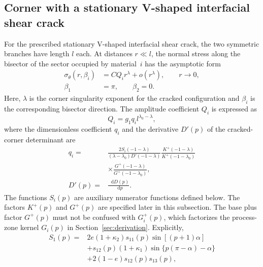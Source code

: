 \documentclass[pdflatex,iicol,sn-mathphys-ay]{sn-jnl}
\newcommand{\dd}{\mathop{}\!\mathrm{d}}
\begin{document}
\begin{appendices}
\subsection{Corner with a stationary V-shaped interfacial shear crack}

For the prescribed stationary V-shaped interfacial shear crack, the two
symmetric branches have length $l$ each. At distances $r\ll l$, the normal stress along the bisector
of the sector occupied by material~$i$ has the asymptotic
form~\citep{NazarenkoKipnis2022Stress}
\begin{equation}
\label{eq:app-cracked-field}
\begin{aligned}
  \sigma_\theta(r,\beta_i)
  &=CQ_i r^\lambda+o\!\left(r^\lambda\right),
  \qquad r\to0,\\
  \beta_1&=\pi,\qquad \beta_2=0.
\end{aligned}
\end{equation}
Here, $\lambda$ is the corner singularity exponent for the cracked
configuration and $\beta_i$ is the corresponding bisector direction.
The amplitude coefficient $Q_i$ is expressed as
\begin{equation*}
  Q_i=g_1q_i l^{\lambda_0-\lambda},
\end{equation*}
where the dimensionless coefficient $q_i$ and the derivative $D'(p)$
of the cracked-corner determinant are
{\small
\begin{equation*}
\begin{aligned}
  q_i={}&
  \frac{2S_i(-1-\lambda)}
  {(\lambda-\lambda_0)D'(-1-\lambda)}
  \frac{K^+(-1-\lambda)}
  {K^+(-1-\lambda_0)}\\
  &\times
  \frac{G^+(-1-\lambda)}
  {G^+(-1-\lambda_0)},\\[2pt]
  D'(p)={}&\frac{\dd D(p)}{\dd p}.
\end{aligned}
\end{equation*}
}
The functions $S_i(p)$ are auxiliary numerator functions defined below.
The factors $K^+(p)$ and $G^+(p)$ are specified later in this subsection.
The base plus factor $G^+(p)$ must not be confused with $G_i^+(p)$, which
factorizes the process-zone kernel $G_i(p)$ in
Section~\ref{sec:derivation}. Explicitly,
{\small
\begin{equation*}
\begin{aligned}
  S_1(p)={}&2e(1+\kappa_2)s_{11}(p)
  \sin[(p+1)\alpha]\\
  &+s_{12}(p)(1+\kappa_1)
  \sin\{p(\pi-\alpha)-\alpha\}\\
  &+2(1-e)s_{12}(p)s_{13}(p),\\[2pt]

\end{aligned}
\end{equation*}}
\end{appendices}
\end{document}
